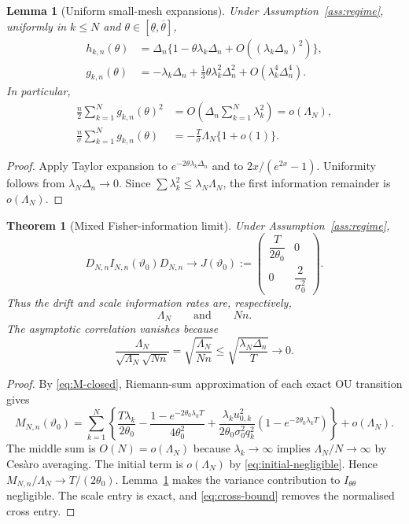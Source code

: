 \documentclass[11pt]{article}
\newtheorem{theorem}[assumption]{Theorem}
\newtheorem{lemma}[assumption]{Lemma}
\theoremstyle{remark}
\newcommand{\1}{\mathbf 1}
\newcommand{\LamN}{\Lambda_N}
\newcommand{\Dn}{D_{N,n}}
\newcommand{\vzero}{\vartheta_0}
\begin{document}
\begin{lemma}[Uniform small-mesh expansions]\label{lem:expansions}
Under Assumption~\ref{ass:regime}, uniformly in $k\le N$ and $\theta\in[\underline\theta,\overline\theta]$,
\begin{align}
 h_{k,n}(\theta)
 &=\Delta_n\{1-\theta\lambda_k\Delta_n
 +O((\lambda_k\Delta_n)^2)\},\label{eq:h-exp}\\
 g_{k,n}(\theta)
 &=-\lambda_k\Delta_n
 +\frac13\theta\lambda_k^2\Delta_n^2
 +O(\lambda_k^4\Delta_n^4).\label{eq:g-exp}
\end{align}
In particular,
\begin{align}
 \frac n2\sum_{k=1}^Ng_{k,n}(\theta)^2
 &=O\!\left(\Delta_n\sum_{k=1}^N\lambda_k^2\right)
 =o(\LamN),\label{eq:variance-theta-small}\\
 \frac n\sigma\sum_{k=1}^Ng_{k,n}(\theta)
 &=-\frac T\sigma\LamN\{1+o(1)\}.
 \label{eq:cross-exp}
\end{align}
\end{lemma}

\begin{proof}
Apply Taylor expansion to $e^{-2\theta\lambda_k\Delta_n}$ and to
$2x/(e^{2x}-1)$.  Uniformity follows from $\lambda_N\Delta_n\to0$.  Since
$\sum\lambda_k^2\le\lambda_N\LamN$, the first information remainder is $o(\LamN)$.
\end{proof}

\begin{theorem}[Mixed Fisher-information limit]\label{thm:info-limit}
Under Assumption~\ref{ass:regime},
\begin{equation}\label{eq:info-limit}
 \Dn I_{N,n}(\vzero)\Dn
 \longrightarrow
 J(\vzero)
 :=\begin{pmatrix}
 \dfrac{T}{2\theta_0}&0\\[2mm]
 0&\dfrac{2}{\sigma_0^2}
 \end{pmatrix}.
\end{equation}
Thus the drift and scale information rates are, respectively,
\[
 \LamN
 \qquad\text{and}\qquad
 Nn.
\]
The asymptotic correlation vanishes because
\begin{equation}\label{eq:cross-bound}
 \frac{\LamN}{\sqrt{\LamN}\sqrt{Nn}}
 =\sqrt{\frac{\LamN}{Nn}}
 \le\sqrt{\frac{\lambda_N\Delta_n}{T}}
 \longrightarrow0.
\end{equation}
\end{theorem}

\begin{proof}
By \eqref{eq:M-closed}, Riemann-sum approximation of each exact OU transition gives
\[
 M_{N,n}(\vzero)
 =\sum_{k=1}^N\left\{
 \frac{T\lambda_k}{2\theta_0}
 -\frac{1-e^{-2\theta_0\lambda_kT}}{4\theta_0^2}
 +\frac{\lambda_ku_{0,k}^2}{2\theta_0\sigma_0^2q_k^2}
 (1-e^{-2\theta_0\lambda_kT})
 \right\}
 +o(\LamN).
\]
The middle sum is $O(N)=o(\LamN)$ because $\lambda_k\to\infty$ implies $\LamN/N\to\infty$ by Ces\`aro averaging.  The initial term is $o(\LamN)$ by \eqref{eq:initial-negligible}.  Hence $M_{N,n}/\LamN\to T/(2\theta_0)$.  Lemma~\ref{lem:expansions} makes the variance contribution to $I_{\theta\theta}$ negligible.  The scale entry is exact, and \eqref{eq:cross-bound} removes the normalised cross entry.
\end{proof}
\end{document}
